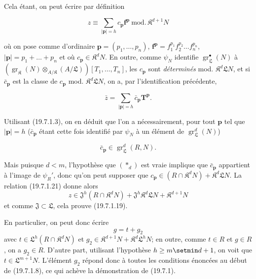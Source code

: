 Cela étant, on peut écrire par définition
\begin{env}[19.7.1.21]
\label{IV.19.7.1.21}
\[
  z\equiv\sum_{|\mathbf p|=h}c_{\mathbf p}\mathbf f^{\mathbf p}\ \mathrm{mod.}\,\mathfrak K^{d+1}N
\]
\end{env}
où on pose comme d'ordinaire $\mathbf p=(p_1,\ldots,p_n)$, $\mathbf f^{\mathbf p}=f_1^{p_1}f_2^{p_2}\ldots f_n^{p_n}$, $|\mathbf p|=p_1+\ldots+p_n$ et où $c_{\mathbf p}\in\mathfrak K^dN$. En outre, comme $\psi_N$ identifie $\operatorname{gr}_{\mathfrak L}^\bullet(N)$ à $(\operatorname{gr}_{\mathfrak K}(N)\otimes_{A/\mathfrak K}(A/\mathfrak L))[T_1,\ldots,T_n]$, les $c_{\mathbf p}$ sont \emph{déterminés} mod. $\mathfrak K^d\mathfrak LN$, et si $\bar c_{\mathbf p}$ est la classe de $c_{\mathbf p}$ mod. $\mathfrak K^d\mathfrak LN$, on a, par l'identification précédente,
\begin{env}[19.7.1.22]
\label{IV.19.7.1.22}
\[
  \bar z=\sum_{|\mathbf p|=h}\bar c_{\mathbf p}\mathbf T^{\mathbf p}.
\]
\end{env}
Utilisant (19.7.1.3), on en déduit que l'on a nécessairement, pour tout $\mathbf p$ tel que $|\mathbf p|=h$ ($\bar c_{\mathbf p}$ étant cette fois identifié par $\psi_N$ à un élément de $\operatorname{gr}_{\mathfrak L}^d(N)$)
\begin{env}[19.7.1.23]
\label{IV.19.7.1.23}
\[
  \bar c_{\mathbf p}\in\operatorname{gr}_{\mathfrak L}^d(R,N).
\]
\end{env}
Mais puisque $d<m$, l'hypothèse que $(*_d)$ est vraie implique que $\bar c_{\mathbf p}$ appartient à l'image de $\psi_R'$, donc qu'on peut supposer que $c_{\mathbf p}\in(R\cap\mathfrak K^dN)+\mathfrak K^d\mathfrak LN$. La relation (19.7.1.21) donne alors
\[
  z\in\mathfrak J^h(R\cap\mathfrak K^dN)+\mathfrak J^h\mathfrak K^d\mathfrak LN+\mathfrak K^{d+1}N
\]
et comme $\mathfrak J\subset\mathfrak L$, cela prouve (19.7.1.19).


En particulier, on peut donc écrire
\[
  g=t+g_2
\]
avec $t\in\mathfrak L^h(R\cap\mathfrak K^dN)$ et $g_2\in\mathfrak K^{d+1}N+\mathfrak K^d\mathfrak L^hN$; en outre, comme $t\in R$ et $g\in R$, on a $g_2\in R$. D'autre part, utilisant l'hypothèse $h\geq m\setmin d+1$, on voit que $t\in\mathfrak L^{m+1}N$. L'élément $g_2$ répond donc à toutes les conditions énoncées au début de (19.7.1.8), ce qui achève la démonstration de (19.7.1).

